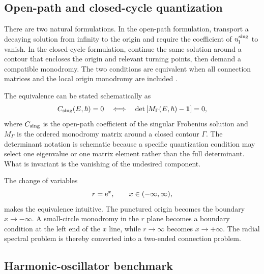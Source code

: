 \subsection{Open-path and closed-cycle quantization}
\label{subsec:open-closed}

There are two natural formulations.  In the open-path formulation, transport
a decaying solution from infinity to the origin and require the coefficient
of $u_l^{\mathrm{sing}}$ to vanish.  In the closed-cycle formulation, continue
the same solution around a contour that encloses the origin and relevant
turning points, then demand a compatible monodromy.  The two conditions are
equivalent when all connection matrices and the local origin monodromy are
included
\cite{AokiKawaiTakei1991RIMS853,Kawai:2005,
AokiIwakiTakahashi2019LoopType,Morikawa:2025ezl}.

The equivalence can be stated schematically as
\begin{equation}
  C_{\mathrm{sing}}(E,\hbar)=0
  \quad\Longleftrightarrow\quad
  \det\left[M_{\Gamma}(E,\hbar)-\mathbf{1}\right]=0 ,
  \label{eq:open-closed-equivalence}
\end{equation}
where $C_{\mathrm{sing}}$ is the open-path coefficient of the singular
Frobenius solution and $M_{\Gamma}$ is the ordered monodromy matrix around a
closed contour $\Gamma$.  The determinant notation is schematic because a
specific quantization condition may select one eigenvalue or one matrix
element rather than the full determinant.  What is invariant is the vanishing
of the undesired component.

The change of variables
\begin{equation}
  r=\mathrm{e}^x,
  \qquad x\in(-\infty,\infty),
  \label{eq:radial-exponential-map}
\end{equation}
makes the equivalence intuitive.  The punctured origin becomes the boundary
$x\to-\infty$.  A small-circle monodromy in the $r$ plane becomes a boundary
condition at the left end of the $x$ line, while $r\to\infty$ becomes
$x\to+\infty$.  The radial spectral problem is thereby converted into a
two-ended connection problem.

\subsection{Harmonic-oscillator benchmark}
\label{subsec:radial-oscillator}

